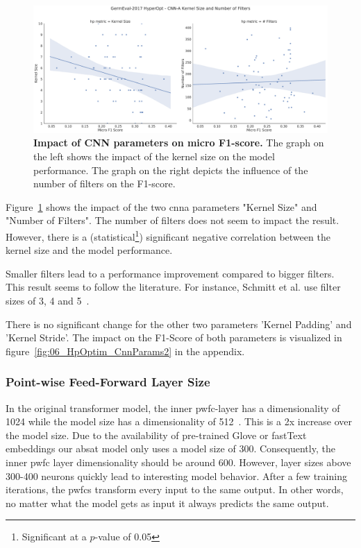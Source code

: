 \begin{figure}[ht]
    \centering
    \includegraphics[width=\textwidth]{figures/06_results/06_hp_ge_lm_cnnParams_test}
    \caption{\textbf{Impact of CNN parameters on micro F1-score.} The graph on the left shows the impact of the kernel size on the model performance. The graph on the right depicts the influence of the number of filters on the F1-score.}
    \label{fig:06_HpOptim_CnnParams}
\end{figure}

Figure~\ref{fig:06_HpOptim_CnnParams} shows the impact of the two \gls{cnna} parameters "Kernel Size" and "Number of Filters". The number of filters does not seem to impact the result. However, there is a {(statistical\footnote{Significant at a $p$-value of 0.05})} significant negative correlation between the kernel size and the model performance. 

Smaller filters lead to a performance improvement compared to bigger filters. This result seems to follow the literature. For instance, Schmitt et al. use filter sizes of 3, 4 and 5~\cite{Schmitt2018}.
\medskip

There is no significant change for the other two parameters 'Kernel Padding' and 'Kernel Stride'. The impact on the F1-Score of both parameters is visualized in figure~\ref{fig:06_HpOptim_CnnParams2} in the appendix.

\subsubsection{Point-wise Feed-Forward Layer Size}

In the original transformer model, the inner \gls{pwfc}-layer has a dimensionality of 1024 while the model size has a dimensionality of 512~\cite{Vaswani2017c}. This is a 2x increase over the model size. Due to the availability of pre-trained Glove or fastText embeddings our \gls{absat} model only uses a model size of 300. Consequently, the inner \gls{pwfc} layer dimensionality should be around 600. However, layer sizes above 300-400 neurons quickly lead to interesting model behavior. After a few training iterations, the \glspl{pwfc} transform every input to the same output. In other words, no matter what the model gets as input it always predicts the same output.
\medskip


